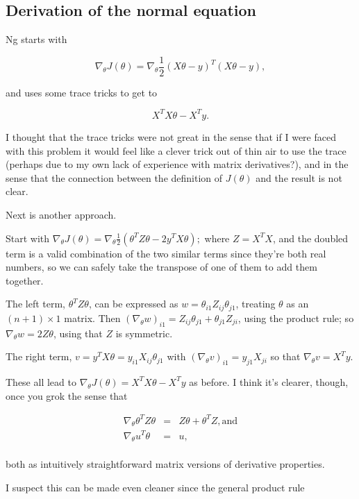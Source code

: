 \documentclass[]{article}
\begin{document}
\subsection{Derivation of the normal
equation}\label{derivation-of-the-normal-equation}

Ng starts with

\[\nabla_\theta J(\theta) = \nabla_\theta\frac{1}{2}(X\theta-y)^T(X\theta-y),\]

and uses some trace tricks to get to

\[X^TX\theta - X^Ty.\]

I thought that the trace tricks were not great in the sense that if I
were faced with this problem it would feel like a clever trick out of
thin air to use the trace (perhaps due to my own lack of experience with
matrix derivatives?), and in the sense that the connection between the
definition of \(J(\theta)\) and the result is not clear.

Next is another approach.

Start with
\(\nabla_\theta J(\theta) = \nabla_\theta \frac{1}{2}(\theta^TZ\theta - 2y^TX\theta);\)
where \(Z=X^TX\), and the doubled term is a valid combination of the two
similar terms since they're both real numbers, so we can safely take the
transpose of one of them to add them together.

\newcommand{\nt}{\nabla_\theta}

The left term, \(\theta^T Z\theta\), can be expressed as
\(w=\theta_{i1}Z_{ij}\theta_{j1}\), treating \(\theta\) as an
\((n+1)\times 1\) matrix. Then
\((\nt w)_{i1} = Z_{ij}\theta_{j1} + \theta_{j1}Z_{ji}\), using the
product rule; so \(\nt w = 2Z\theta\), using that \(Z\) is symmetric.

The right term, \(v = y^TX\theta = y_{i1}X_{ij}\theta_{j1}\) with
\((\nt v)_{i1} = y_{j1}X_{ji}\) so that \(\nt v = X^Ty\).

These all lead to \(\nt J(\theta) = X^TX\theta - X^Ty\) as before. I
think it's clearer, though, once you grok the sense that

\[\begin{array}{rcl}
\nt \theta^TZ\theta & = & Z\theta + \theta^T Z, \text{and} \\
\nt u^T\theta & = & u, \\
\end{array}\]

both as intuitively straightforward matrix versions of derivative
properties.

I suspect this can be made even cleaner since the general product rule
\end{document}

